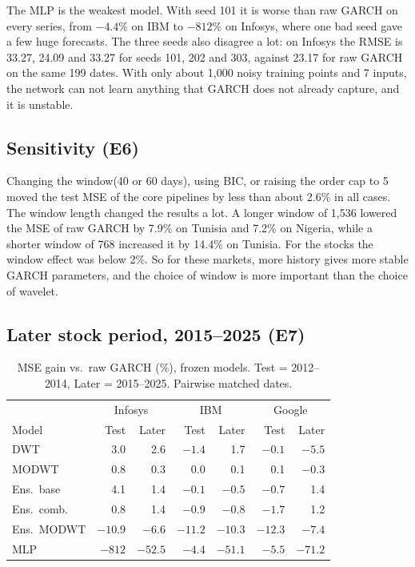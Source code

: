 \documentclass{article}
\begin{document}
The MLP is the weakest model. With seed 101 it is worse than raw GARCH on every series, from $-4.4\%$ on IBM to $-812\%$ on Infosys, where one bad seed gave a few huge forecasts. The three seeds also disagree a lot: on Infosys the RMSE is 33.27, 24.09 and 33.27 for seeds 101, 202 and 303, against 23.17 for raw GARCH on the same 199 dates. With only about 1,000 noisy training points and 7 inputs, the network can not learn anything that GARCH does not already capture, and it is unstable.

\subsection{Sensitivity (E6)}

Changing the window(40 or 60 days), using BIC, or raising the order cap to 5 moved the test MSE of the core pipelines by less than about 2.6\% in all cases. The window length changed the results a lot. A longer window of 1,536 lowered the MSE of raw GARCH by 7.9\% on Tunisia and 7.2\% on Nigeria, while a shorter window of 768 increased it by 14.4\% on Tunisia. For the stocks the window effect was below 2\%. So for these markets, more history gives more stable GARCH parameters, and the choice of window is more important than the choice of wavelet.

\subsection{Later stock period, 2015--2025 (E7)}

\begin{table}[t]
\caption{MSE gain vs.\ raw GARCH (\%), frozen models. Test = 2012--2014, Later = 2015--2025. Pairwise matched dates.}
\label{tab:later}
\centering\small
\setlength{\tabcolsep}{3pt}
\begin{tabular}{lrrrrrr}
\toprule
 & \multicolumn{2}{c}{Infosys} & \multicolumn{2}{c}{IBM} & \multicolumn{2}{c}{Google}\\
Model & Test & Later & Test & Later & Test & Later\\
\midrule
DWT & 3.0 & 2.6 & $-1.4$ & 1.7 & $-0.1$ & $-5.5$\\
MODWT & 0.8 & 0.3 & 0.0 & 0.1 & 0.1 & $-0.3$\\
Ens.\ base & 4.1 & 1.4 & $-0.1$ & $-0.5$ & $-0.7$ & 1.4\\
Ens.\ comb. & 0.8 & 1.4 & $-0.9$ & $-0.8$ & $-1.7$ & 1.2\\
Ens.\ MODWT & $-10.9$ & $-6.6$ & $-11.2$ & $-10.3$ & $-12.3$ & $-7.4$\\
MLP & $-812$ & $-52.5$ & $-4.4$ & $-51.1$ & $-5.5$ & $-71.2$\\
\bottomrule
\end{tabular}
\end{table}
\end{document}
